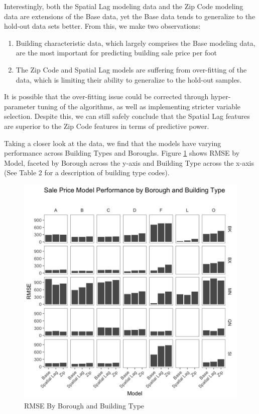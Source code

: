 \documentclass[12pt,]{article}
\providecommand{\tightlist}{%
  \setlength{\itemsep}{0pt}\setlength{\parskip}{0pt}}
\begin{document}
Interestingly, both the Spatial Lag modeling data and the Zip Code
modeling data are extensions of the Base data, yet the Base data tends
to generalize to the hold-out data sets better. From this, we make two
observations:

\begin{enumerate}
\def\labelenumi{\arabic{enumi})}
\tightlist
\item
  Building characteristic data, which largely comprises the Base
  modeling data, are the most important for predicting building sale
  price per foot
\item
  The Zip Code and Spatial Lag models are suffering from over-fitting of
  the data, which is limiting their ability to generalize to the
  hold-out samples.
\end{enumerate}

It is possible that the over-fitting issue could be corrected through
hyper-parameter tuning of the algorithms, as well as implementing
stricter variable selection. Despite this, we can still safely conclude
that the Spatial Lag features are superior to the Zip Code features in
terms of predictive power.

Taking a closer look at the data, we find that the models have varying
performance across Building Types and Boroughs. Figure
\ref{fig:RMSE by boro and build type} shows RMSE by Model, faceted by
Borough across the y-axis and Building Type across the x-axis (See Table
2 for a description of building type codes).

\begin{figure}[h]
\includegraphics[width=1\linewidth]{Sections/tables and figures/RMSE by boro and build type} \caption{RMSE By Borough and Building Type}\label{fig:RMSE by boro and build type}
\end{figure}
\end{document}
